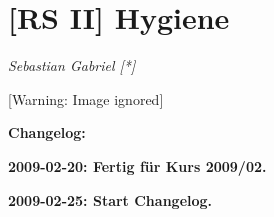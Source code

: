 \documentclass{article}
\newcommand\gEs[1]{\textbf{\textcolor[rgb]{0.0,0.0,0.5019608}{#1}}}
\newcommand\gEs[1]{\textbf{\textcolor[rgb]{0.0,0.0,0.5019608}{#1}}}
\begin{document}
\section[[RS II{]} Hygiene ]{[RS II] Hygiene }
\label{bkm:RefHeading32633609}{\mdseries\itshape
Sebastian Gabriel [*]}

\begin{center}
 [Warning: Image ignored] %

\end{center}
{\bfseries\color[rgb]{0.5019608,0.0,0.0}
\gEs{Changelog:}}

{\bfseries\color[rgb]{0.5019608,0.0,0.0}
2009-02-20: Fertig f\"ur Kurs 2009/02.}

{\bfseries\color[rgb]{0.5019608,0.0,0.0}
2009-02-25: Start Changelog.}
\end{document}
